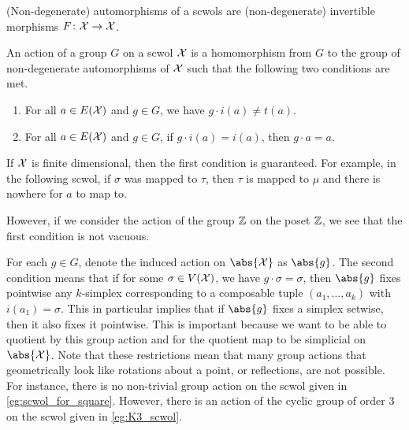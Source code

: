 (Non-degenerate) automorphisms of a scwols are (non-degenerate) invertible morphisms $F \colon \mathcal{X} \to \mathcal{X}$.

\begin{definition}
	An action of a group $G$ on a scwol $\mathcal{X}$ is a homomorphism from $G$ to the group of non-degenerate automorphisms of $\mathcal{X}$ such that the following two conditions are met.
	\begin{enumerate}
		\item For all $a \in E(\mathcal{X})$ and $g \in G$, we have  $g \cdot i(a) \neq t(a)$.
		\item For all $a \in E(\mathcal{X})$ and $g \in G$, if  $g\cdot i(a)=i(a)$, then  $g\cdot a = a$.
	\end{enumerate}
	\label{def:action_of_groups_on_scwols}
\end{definition}

If $\mathcal{X}$ is finite dimensional, then the first condition is guaranteed.
For example, in the following scwol, if $\sigma$ was mapped to  $\tau$, then $\tau$ is mapped to $\mu$ and there is nowhere for $a$ to map to.

\begin{center}
\end{center}

However, if we consider the action of the group $\mathbb{Z}$ on the poset $\mathbb{Z}$, we see that  the first condition is not vacuous.

For each $g \in G$, denote the induced action on  $\abs{\calx}$ as $\abs{g}$.
The second condition means that if for some $\sigma \in V(\mathcal{X})$, we have $g \cdot \sigma = \sigma$, then $\abs{g}$ fixes pointwise any $k$-simplex corresponding to a composable tuple $(a_1,  \ldots, a_k)$ with $i(a_1)=\sigma$.
This in particular implies that if $\abs{g}$ fixes a simplex setwise, then it also fixes it pointwise.
This is important because we want to be able to quotient by this group action and for the quotient map to be simplicial on $\abs{\calx}$.
Note that these restrictions mean that many group actions that geometrically look like rotations about a point, or reflections, are not possible.
For instance, there is no non-trivial group action on the scwol given in \cref{eg:scwol_for_square}.
However, there is an action of the cyclic group of order 3 on the scwol given in \cref{eg:K3_scwol}.

